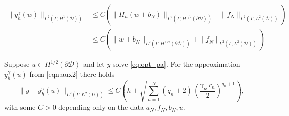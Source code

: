\documentclass[10pt,a4paper]{amsart}
\newcommand{\cD}{{\mathcal{D}}}
\newcommand{\uH}{{L^2(\Gamma;H^{1/2}(\partial \cD))}}
\newcommand{\yH}{{L^2(\Gamma;H^1(\cD))}}
\newcommand{\yL}{{L^2(\Gamma;L^2(\cD))}}
\begin{document}
\begin{align}\label{ineq:yh_Piu}
  \|y_h^{\gamma}(w) \|_{\yH} &\le C \left( \|\Pi_h(w + b_{N})\|_{\uH} + \|f_N\|_{\yL}  \right) \nonumber \\
  &\le C \left( \|w + b_{N}\|_{\uH} + \|f_N\|_{\yL}  \right)
\end{align}

\begin{lemma}\label{lem:FE_error_state_eq}
  Suppose $u\in H^{1/2}(\partial\cD)$ and let $y$ solve \eqref{eq:opt_pa}. For the approximation $y_h^\gamma(u)$ from \eqref{eqn:aux2} there holds
  \begin{equation*}
    \|y-y_h^\gamma(u)\|_{L^2(\Gamma; L^2(\Omega))} 
    \le C\left(
      h 
      + \sqrt{\sum_{n=1}^N(q_n+2)\,\left(\frac{\gamma_n\,r_n}{2}\right)^{q_n+1}}
    \right),
  \end{equation*}
  with some $C>0$ depending only on the data $a_N, f_N, b_N, u$.
\end{lemma}
\end{document}
